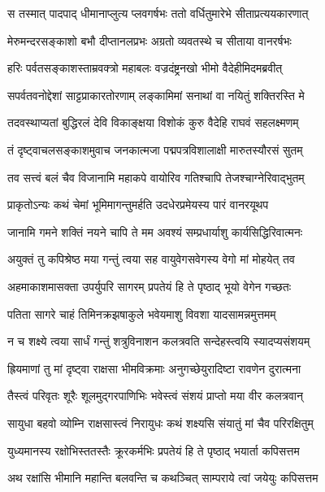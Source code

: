 \twolineshloka
{स तस्मात् पादपाद् धीमानाप्लुत्य प्लवगर्षभः}
{ततो वर्धितुमारेभे सीताप्रत्ययकारणात्} %

\twolineshloka
{मेरुमन्दरसङ्काशो बभौ दीप्तानलप्रभः}
{अग्रतो व्यवतस्थे च सीताया वानरर्षभः} %

\twolineshloka
{हरिः पर्वतसङ्काशस्ताम्रवक्त्रो महाबलः}
{वज्रदंष्ट्रनखो भीमो वैदेहीमिदमब्रवीत्} %

\twolineshloka
{सपर्वतवनोद्देशां साट्टप्राकारतोरणाम्}
{लङ्कामिमां सनाथां वा नयितुं शक्तिरस्ति मे} %

\twolineshloka
{तदवस्थाप्यतां बुद्धिरलं देवि विकाङ्क्षया}
{विशोकं कुरु वैदेहि राघवं सहलक्ष्मणम्} %

\twolineshloka
{तं दृष्ट्वाचलसङ्काशमुवाच जनकात्मजा}
{पद्मपत्रविशालाक्षी मारुतस्यौरसं सुतम्} %

\twolineshloka
{तव सत्त्वं बलं चैव विजानामि महाकपे}
{वायोरिव गतिश्चापि तेजश्चाग्नेरिवाद्भुतम्} %

\twolineshloka
{प्राकृतोऽन्यः कथं चेमां भूमिमागन्तुमर्हति}
{उदधेरप्रमेयस्य पारं वानरयूथप} %

\twolineshloka
{जानामि गमने शक्तिं नयने चापि ते मम}
{अवश्यं सम्प्रधार्याशु कार्यसिद्धिरिवात्मनः} %

\twolineshloka
{अयुक्तं तु कपिश्रेष्ठ मया गन्तुं त्वया सह}
{वायुवेगसवेगस्य वेगो मां मोहयेत् तव} %

\twolineshloka
{अहमाकाशमासक्ता उपर्युपरि सागरम्}
{प्रपतेयं हि ते पृष्ठाद् भूयो वेगेन गच्छतः} %

\twolineshloka
{पतिता सागरे चाहं तिमिनक्रझषाकुले}
{भवेयमाशु विवशा यादसामन्नमुत्तमम्} %

\twolineshloka
{न च शक्ष्ये त्वया सार्धं गन्तुं शत्रुविनाशन}
{कलत्रवति सन्देहस्त्वयि स्यादप्यसंशयम्} %

\twolineshloka
{ह्रियमाणां तु मां दृष्ट्वा राक्षसा भीमविक्रमाः}
{अनुगच्छेयुरादिष्टा रावणेन दुरात्मना} %

\twolineshloka
{तैस्त्वं परिवृतः शूरैः शूलमुद्गरपाणिभिः}
{भवेस्त्वं संशयं प्राप्तो मया वीर कलत्रवान्} %

\twolineshloka
{सायुधा बहवो व्योम्नि राक्षसास्त्वं निरायुधः}
{कथं शक्ष्यसि संयातुं मां चैव परिरक्षितुम्} %

\twolineshloka
{युध्यमानस्य रक्षोभिस्ततस्तैः क्रूरकर्मभिः}
{प्रपतेयं हि ते पृष्ठाद् भयार्ता कपिसत्तम} %

\twolineshloka
{अथ रक्षांसि भीमानि महान्ति बलवन्ति च}
{कथञ्चित् साम्पराये त्वां जयेयुः कपिसत्तम} %

